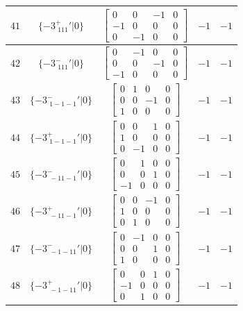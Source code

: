 \documentclass[fleqn,8pt]{jsarticle}
\begin{document}
\begin{longtable}{ccccc}
$ 41 $ & $ \{-3^{+}_{\,\,111}{}'|0\} $ & $ \begin{bmatrix} 0 & 0 & -1 & 0 \\ -1 & 0 & 0 & 0 \\ 0 & -1 & 0 & 0 \end{bmatrix} $ & $ -1 $ & $ -1 $ \\ \hline
$ 42 $ & $ \{-3^{-}_{\,\,111}{}'|0\} $ & $ \begin{bmatrix} 0 & -1 & 0 & 0 \\ 0 & 0 & -1 & 0 \\ -1 & 0 & 0 & 0 \end{bmatrix} $ & $ -1 $ & $ -1 $ \\ \hline
$ 43 $ & $ \{-3^{-}_{\,\,1-1-1}{}'|0\} $ & $ \begin{bmatrix} 0 & 1 & 0 & 0 \\ 0 & 0 & -1 & 0 \\ 1 & 0 & 0 & 0 \end{bmatrix} $ & $ -1 $ & $ -1 $ \\ \hline
$ 44 $ & $ \{-3^{+}_{\,\,1-1-1}{}'|0\} $ & $ \begin{bmatrix} 0 & 0 & 1 & 0 \\ 1 & 0 & 0 & 0 \\ 0 & -1 & 0 & 0 \end{bmatrix} $ & $ -1 $ & $ -1 $ \\ \hline
$ 45 $ & $ \{-3^{-}_{\,\,-11-1}{}'|0\} $ & $ \begin{bmatrix} 0 & 1 & 0 & 0 \\ 0 & 0 & 1 & 0 \\ -1 & 0 & 0 & 0 \end{bmatrix} $ & $ -1 $ & $ -1 $ \\ \hline
$ 46 $ & $ \{-3^{+}_{\,\,-11-1}{}'|0\} $ & $ \begin{bmatrix} 0 & 0 & -1 & 0 \\ 1 & 0 & 0 & 0 \\ 0 & 1 & 0 & 0 \end{bmatrix} $ & $ -1 $ & $ -1 $ \\ \hline
$ 47 $ & $ \{-3^{-}_{\,\,-1-11}{}'|0\} $ & $ \begin{bmatrix} 0 & -1 & 0 & 0 \\ 0 & 0 & 1 & 0 \\ 1 & 0 & 0 & 0 \end{bmatrix} $ & $ -1 $ & $ -1 $ \\ \hline
$ 48 $ & $ \{-3^{+}_{\,\,-1-11}{}'|0\} $ & $ \begin{bmatrix} 0 & 0 & 1 & 0 \\ -1 & 0 & 0 & 0 \\ 0 & 1 & 0 & 0 \end{bmatrix} $ & $ -1 $ & $ -1 $ \\ \hline

\end{longtable}
\end{document}
